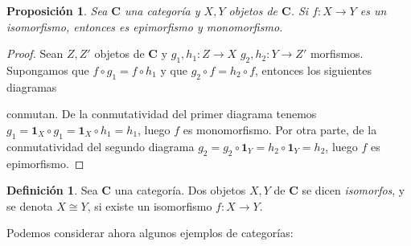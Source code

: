 \documentclass[12pt,a4paper]{book}
\newtheorem{prop}[thm]{Proposición}
\theoremstyle{definition} \newtheorem{defn}[thm]{Definición}
\theoremstyle{definition} \newtheorem{ejemplo}[thm]{Ejemplo}
\theoremstyle{definition} \newtheorem{ejercicio}[thm]{Ejercicio}
\theoremstyle{remark} \newtheorem*{obs}{Observación}
\def\id{\mathbf{1}}
\def\cat{\mathbf{C}}
\begin{document}
\begin{prop}
  Sea $\cat$ una categoría y $X,Y$ objetos de $\cat$. Si $f:X\rightarrow Y$ es un isomorfismo, entonces es epimorfismo y monomorfismo.
\end{prop}
\begin{proof}
  Sean $Z,Z'$ objetos de $\cat$ y $g_1,h_1:Z\rightarrow X$ $g_2,h_2:Y\rightarrow Z'$ morfismos. Supongamos que $f\circ g_1= f\circ h_1$ y que $g_2 \circ f = h_2 \circ f$, entonces los siguientes diagramas
  \begin{center}
  \end{center}
  \begin{center}
  \end{center}
  conmutan. De la conmutatividad del primer diagrama tenemos $g_1=\id_X \circ g_1 = \id_X \circ h_1 = h_1$, luego $f$ es monomorfismo. Por otra parte, de la conmutatividad del segundo diagrama $g_2=g_2\circ\id_Y=h_2 \circ \id_Y=h_2$, luego $f$ es epimorfismo.
\end{proof}

\begin{defn}
  Sea $\cat$ una categoría. Dos objetos $X, Y$ de $\cat$ se dicen \emph{isomorfos}, y se denota $X\cong Y$, si existe un isomorfismo $f:X\rightarrow Y$.
\end{defn}

Podemos considerar ahora algunos ejemplos de categorías:
\end{document}
